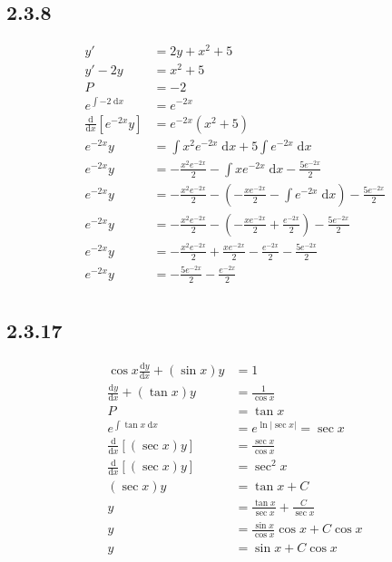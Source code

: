 \documentclass{article}
\begin{document}
\subsection{2.3.8}
\begin{align*}
    y' &= 2y+x^2+5\\
    y'-2y &= x^2+5\\
    P &= -2\\
    e^{\int -2 \; \mathrm{d}x} &= e^{-2x}\\
    \frac{\mathrm{d}}{\mathrm{d}x}\left[e^{-2x}y\right] &= e^{-2x}(x^2+5)\\
    e^{-2x}y &= \int x^2e^{-2x} \; \mathrm{d}x+5 \int e^{-2x} \; \mathrm{d}x\\
    e^{-2x}y &= -\frac{x^2e^{-2x}}{2}-\int xe^{-2x} \; \mathrm{d}x-\frac{5e^{-2x}}{2}\\
    e^{-2x}y &= -\frac{x^2e^{-2x}}{2}-(-\frac{xe^{-2x}}{2}-\int e^{-2x} \; \mathrm{d}x)-\frac{5e^{-2x}}{2}\\
    e^{-2x}y &= -\frac{x^2e^{-2x}}{2}-(-\frac{xe^{-2x}}{2}+\frac{e^{-2x}}{2})-\frac{5e^{-2x}}{2}\\
    e^{-2x}y &= -\frac{x^2e^{-2x}}{2}+\frac{xe^{-2x}}{2}-\frac{e^{-2x}}{2}-\frac{5e^{-2x}}{2}\\
    e^{-2x}y &= -\frac{5e^{-2x}}{2}-\frac{e^{-2x}}{2}\\
\end{align*}

\subsection{2.3.17}
\begin{align*}
    \cos x \frac{\mathrm{d}y}{\mathrm{d}x}+(\sin x)y &= 1\\
    \frac{\mathrm{d}y}{\mathrm{d}x}+(\tan x)y &= \frac{1}{\cos x}\\
    P &= \tan x \\
    e^{\int \tan x \; \mathrm{d}x} &= e^{\ln\left|\sec x\right|} =\sec x \\
    \frac{\mathrm{d}}{\mathrm{d}x}\left[(\sec x)y\right] &= \frac{\sec x}{\cos x}\\
    \frac{\mathrm{d}}{\mathrm{d}x}\left[(\sec x)y\right] &= \sec ^2x\\
    (\sec x)y &= \tan x+C\\
    y &= \frac{\tan x}{\sec x}+\frac{C}{\sec x}\\
    y &= \frac{\sin x}{\cos x}\cos x+C\cos x\\
    y &= \sin x +C\cos x
\end{align*}
\end{document}
